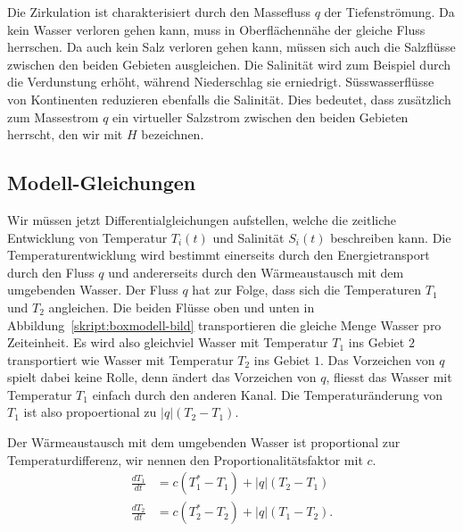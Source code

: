 Die Zirkulation ist charakterisiert durch den Massefluss $q$ der
Tiefenströmung.
Da kein Wasser verloren gehen kann, muss in Oberflächennähe der gleiche
Fluss herrschen.
Da auch kein Salz verloren gehen kann, müssen sich auch die Salzflüsse
zwischen den beiden Gebieten ausgleichen.
Die Salinität wird zum Beispiel durch die Verdunstung erhöht, während
Niederschlag sie erniedrigt.
Süsswasserflüsse von Kontinenten reduzieren ebenfalls die Salinität.
Dies bedeutet, dass zusätzlich zum Massestrom $q$ ein virtueller 
Salzstrom zwischen den beiden Gebieten herrscht, den wir mit $H$ bezeichnen.

\subsection{Modell-Gleichungen}
Wir müssen jetzt Differentialgleichungen aufstellen, welche die
zeitliche Entwicklung von Temperatur $T_i(t)$ und Salinität $S_i(t)$
beschreiben kann.
Die Temperaturentwicklung wird bestimmt einerseits durch den Energietransport
durch den Fluss $q$ und andererseits durch den Wärmeaustausch mit dem
umgebenden Wasser.
Der Fluss $q$ hat zur Folge, dass sich die Temperaturen $T_1$ und $T_2$
angleichen.
Die beiden Flüsse oben und unten in Abbildung~\ref{skript:boxmodell-bild}
transportieren die gleiche Menge Wasser pro Zeiteinheit.
Es wird also gleichviel Wasser mit Temperatur $T_1$ ins Gebiet $2$ 
transportiert wie Wasser mit Temperatur $T_2$ ins Gebiet $1$.
Das Vorzeichen von $q$ spielt dabei keine Rolle, denn ändert das
Vorzeichen von $q$, fliesst das Wasser mit Temperatur $T_1$ einfach
durch den anderen Kanal.
Die Temperaturänderung von $T_1$ ist also propoertional zu $|q|(T_2-T_1)$.

Der Wärmeaustausch mit dem umgebenden Wasser ist proportional zur
Temperaturdifferenz, wir nennen den Proportionalitätsfaktor mit $c$.
\begin{equation}
\begin{aligned}
\frac{dT_1}{dt}
&=
c(T_1^*-T_1)
+
|q|(T_2-T_1)
\\
\frac{dT_2}{dt}
&=
c(T_2^*-T_2)
+
|q|(T_1-T_2).
\end{aligned}
\label{skript:thc:temperaturgleichung}
\end{equation}

